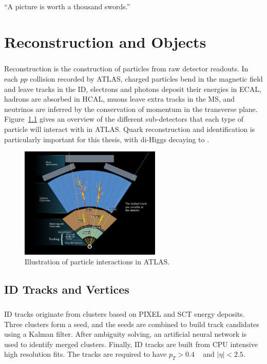 \begin{savequote}[75mm]
“A picture is worth a thousand swords.”
\end{savequote}

\chapter{Reconstruction and Objects}

\paragraph{}
Reconstruction is the construction of particles from raw detector readouts. 
In each $pp$ collision recorded by ATLAS, charged particles bend in the magnetic field and leave tracks in the ID, electrons and photons deposit their energies in ECAL, hadrons are absorbed in HCAL, muons leave extra tracks in the MS, and neutrinos are inferred by the conservation of momentum in the transverse plane. 
Figure~\ref{fig:obj_reco_overview} gives an overview of the different sub-detectors that each type of particle will interact with in ATLAS. Quark reconstruction and identification is particularly important for this thesis, with di-Higgs decaying to \bbbb.

\begin{figure}[htbp!]
  \centering
  \captionsetup{justification=centering}
  \includegraphics[width=0.6\textwidth]{figures/detector/ATLAS_particle}
   \caption{Illustration of particle interactions in ATLAS.}
  \label{fig:obj_reco_overview}
\end{figure}

\section{ID Tracks and Vertices}
\paragraph{}
ID tracks originate from clusters based on PIXEL and SCT energy deposits.
Three clusters form a seed, and the seeds are combined to build track candidates using a Kalman filter. 
After ambiguity solving, an artificial neural network is used to identify merged clusters.
Finally, ID tracks are built from CPU intensive high resolution fits.
The tracks are required to have $p_T > 0.4$ \GeV~ and $|\eta| < 2.5$.


